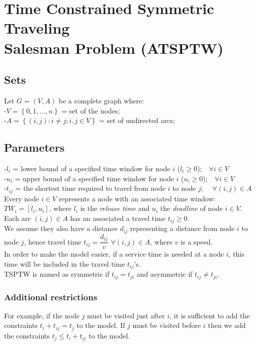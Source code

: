 \documentclass[a4paper,12pt,titlepage]{article}
\begin{document}
\section*{Time Constrained Symmetric Traveling\\ Salesman Problem (ATSPTW)}
\subsection*{Sets}
Let $G = (V, A)$ be a complete graph where: \\
-$V=\left \lbrace 0,1, …, n\right\rbrace$ = set of the nodes;\\
-$A=\left \lbrace(i, j): i \neq j; i,j\in V\right\rbrace$ = set of undirected arcs;
\subsection*{Parameters}
-$l_i$ = lower bound of a specified time window for node $i$ ($l_i\geq 0$);\,\,\,\ $\forall i\in V$\\
-$u_i$ = upper bound of a specified time window for node $i$ ($u_i\geq 0$);\,\,\,\ $\forall i\in V$\\
-$t_{ij}$ = the shortest time required to travel from node $i$ to node $j$;
\,\,\,\ $\forall(i,j)\in A$\\
Every node $i\in V$ represents a node with an associated time window:\\
$TW_i=[l_i, u_i]$, where
$l_i$ is the  \textit{release time} and $u_i$ the \textit{deadline} of node $i\in V$. \\
Each arc $(i, j) \in A$ has
an associated a travel time $t_{ij} \geq 0$.\\
We assume they also have a distance  $d_{ij}$ representing a distance from node $i$ to node $j$, hence travel time $t_{ij} = \dfrac{d_{ij}}{v}$ $\forall (i,j)\in A$, where $v$ is a speed.\\
In order to make the model easier, if a service time is needed at a node $i$, this time will be included in the travel time $t_{ij}$’s.\\
TSPTW is named as symmetric if $t_{ij}= t_{ji}$ and asymmetric if $t_{ij} \neq t_{ji}$.
\subsubsection*{Additional restrictions}
For example, if the node $j$ must be visited just after $i$, it is sufficient to add the constraints $t_i + t_{ij}= t_j$ to the model. If $j$ must be visited before $i$
then we add the constraints $t_j \leq t_i + t_{ij}$ to the model.
\end{document}
